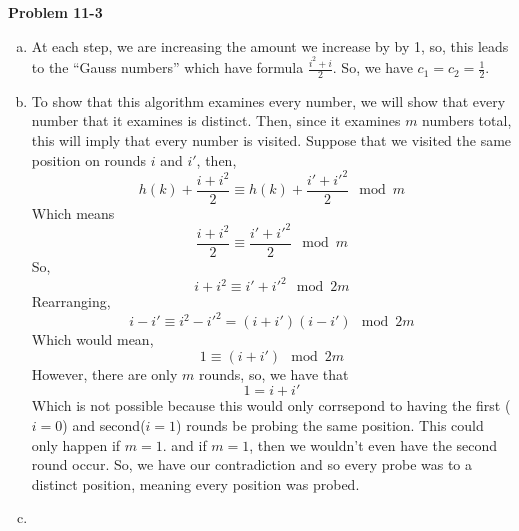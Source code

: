 \documentclass{article}
\begin{document}
\noindent\textbf{ Problem 11-3} \\
\begin{enumerate}[a.]
\item
At each step, we are increasing the amount we increase by by 1, so, this leads to the ``Gauss numbers'' which have formula $\frac{i^2+i}{2}$. So, we have $c_1 = c_2 = \frac{1}{2}$.

\item

To show that this algorithm examines every number, we will show that every number that it examines is distinct. Then, since it examines $m$ numbers total, this will imply that every number is visited. Suppose that we visited the same position on rounds $i$ and $i'$, then,
\[
h(k) + \frac{i+i^2}{2} \equiv h(k) + \frac{i'+i'^2}{2} \mod m
\]
Which means
\[
 \frac{i+i^2}{2} \equiv\frac{i'+i'^2}{2} \mod m
\]
So,
\[
 i+i^2 \equiv i'+i'^2 \mod 2m
\]
Rearranging,
\[
 i - i' \equiv i^2 - i'^2 = (i+i')(i-i') \mod 2m
\]
Which would mean,
\[
1 \equiv(i+i') \mod 2m
\]
However, there are only $m$ rounds, so, we have that
\[
1 = i+i'
\]
Which is not possible because this would only corrsepond to having the first ($i=0$) and second($i=1$) rounds be probing the same position. This could only happen if $m=1$. and if $m=1$, then we wouldn't even have the second round occur. So, we have our contradiction and so every probe was to a distinct position, meaning every position was probed.
\item

\end{enumerate}
\end{document}
